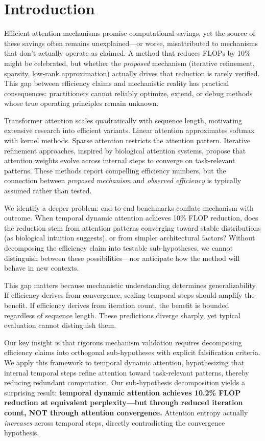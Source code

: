 \section{Introduction}
\label{sec:introduction}

Efficient attention mechanisms promise computational savings, yet the source of these savings often remains unexplained---or worse, misattributed to mechanisms that don't actually operate as claimed. A method that reduces FLOPs by 10\% might be celebrated, but whether the \emph{proposed} mechanism (iterative refinement, sparsity, low-rank approximation) actually drives that reduction is rarely verified. This gap between efficiency claims and mechanistic reality has practical consequences: practitioners cannot reliably optimize, extend, or debug methods whose true operating principles remain unknown.

Transformer attention scales quadratically with sequence length, motivating extensive research into efficient variants. Linear attention approximates softmax with kernel methods. Sparse attention restricts the attention pattern. Iterative refinement approaches, inspired by biological attention systems, propose that attention weights evolve across internal steps to converge on task-relevant patterns. These methods report compelling efficiency numbers, but the connection between \emph{proposed mechanism} and \emph{observed efficiency} is typically assumed rather than tested.

We identify a deeper problem: end-to-end benchmarks conflate mechanism with outcome. When temporal dynamic attention achieves 10\% FLOP reduction, does the reduction stem from attention patterns converging toward stable distributions (as biological intuition suggests), or from simpler architectural factors? Without decomposing the efficiency claim into testable sub-hypotheses, we cannot distinguish between these possibilities---nor anticipate how the method will behave in new contexts.

This gap matters because mechanistic understanding determines generalizability. If efficiency derives from convergence, scaling temporal steps should amplify the benefit. If efficiency derives from iteration count, the benefit is bounded regardless of sequence length. These predictions diverge sharply, yet typical evaluation cannot distinguish them.

Our key insight is that rigorous mechanism validation requires decomposing efficiency claims into orthogonal sub-hypotheses with explicit falsification criteria. We apply this framework to temporal dynamic attention, hypothesizing that internal temporal steps refine attention toward task-relevant patterns, thereby reducing redundant computation. Our sub-hypothesis decomposition yields a surprising result: \textbf{temporal dynamic attention achieves 10.2\% FLOP reduction at equivalent perplexity---but through reduced iteration count, NOT through attention convergence.} Attention entropy actually \emph{increases} across temporal steps, directly contradicting the convergence hypothesis.

